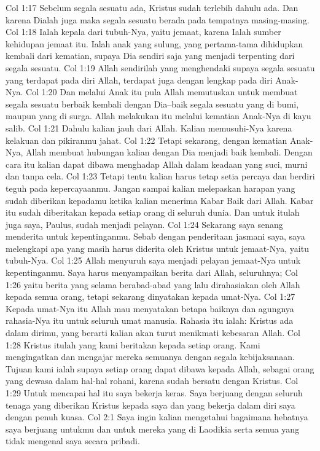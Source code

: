 Col 1:17  Sebelum segala sesuatu ada, Kristus sudah terlebih dahulu ada. Dan karena Dialah juga maka segala sesuatu berada pada tempatnya masing-masing.
Col 1:18  Ialah kepala dari tubuh-Nya, yaitu jemaat, karena Ialah sumber kehidupan jemaat itu. Ialah anak yang sulung, yang pertama-tama dihidupkan kembali dari kematian, supaya Dia sendiri saja yang menjadi terpenting dari segala sesuatu.
Col 1:19  Allah sendirilah yang menghendaki supaya segala sesuatu yang terdapat pada diri Allah, terdapat juga dengan lengkap pada diri Anak-Nya.
Col 1:20  Dan melalui Anak itu pula Allah memutuskan untuk membuat segala sesuatu berbaik kembali dengan Dia--baik segala sesuatu yang di bumi, maupun yang di surga. Allah melakukan itu melalui kematian Anak-Nya di kayu salib.
Col 1:21  Dahulu kalian jauh dari Allah. Kalian memusuhi-Nya karena kelakuan dan pikiranmu jahat.
Col 1:22  Tetapi sekarang, dengan kematian Anak-Nya, Allah membuat hubungan kalian dengan Dia menjadi baik kembali. Dengan cara itu kalian dapat dibawa menghadap Allah dalam keadaan yang suci, murni dan tanpa cela.
Col 1:23  Tetapi tentu kalian harus tetap setia percaya dan berdiri teguh pada kepercayaanmu. Jangan sampai kalian melepaskan harapan yang sudah diberikan kepadamu ketika kalian menerima Kabar Baik dari Allah. Kabar itu sudah diberitakan kepada setiap orang di seluruh dunia. Dan untuk itulah juga saya, Paulus, sudah menjadi pelayan.
Col 1:24  Sekarang saya senang menderita untuk kepentinganmu. Sebab dengan penderitaan jasmani saya, saya melengkapi apa yang masih harus diderita oleh Kristus untuk jemaat-Nya, yaitu tubuh-Nya.
Col 1:25  Allah menyuruh saya menjadi pelayan jemaat-Nya untuk kepentinganmu. Saya harus menyampaikan berita dari Allah, seluruhnya;
Col 1:26  yaitu berita yang selama berabad-abad yang lalu dirahasiakan oleh Allah kepada semua orang, tetapi sekarang dinyatakan kepada umat-Nya.
Col 1:27  Kepada umat-Nya itu Allah mau menyatakan betapa baiknya dan agungnya rahasia-Nya itu untuk seluruh umat manusia. Rahasia itu ialah: Kristus ada dalam dirimu, yang berarti kalian akan turut menikmati kebesaran Allah.
Col 1:28  Kristus itulah yang kami beritakan kepada setiap orang. Kami mengingatkan dan mengajar mereka semuanya dengan segala kebijaksanaan. Tujuan kami ialah supaya setiap orang dapat dibawa kepada Allah, sebagai orang yang dewasa dalam hal-hal rohani, karena sudah bersatu dengan Kristus.
Col 1:29  Untuk mencapai hal itu saya bekerja keras. Saya berjuang dengan seluruh tenaga yang diberikan Kristus kepada saya dan yang bekerja dalam diri saya dengan penuh kuasa.
Col 2:1  Saya ingin kalian mengetahui bagaimana hebatnya saya berjuang untukmu dan untuk mereka yang di Laodikia serta semua yang tidak mengenal saya secara pribadi.
